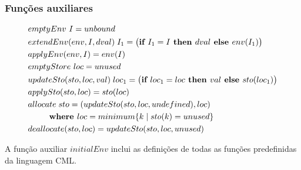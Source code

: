 \documentclass[12pt]{article}
\begin{document}
\subsubsection{Funções auxiliares}

\begin{align*}
&emptyEnv\ I = unbound \\
&extendEnv(env, I, dval) \;I_1 = \big(\textbf{if } I_1 = I \textbf{ then } dval \textbf{ else } env(I_1)\big) \\
&applyEnv(env, I) = env(I) \\
&emptyStore\ loc = unused \\
&updateSto(sto,loc,val) \;loc_1 = \big( \textbf{if $loc_1 = loc$ then $val$ else $sto(loc_1)$}\big) \\
&applySto(sto, loc) = sto(loc)\\
&allocate \;sto = (updateSto(sto, loc, undefined), loc) \\
&\hspace{6ex} \textbf{where } loc = minimum \{k \mid sto(k) = unused\} \\
&deallocate(sto,loc) = updateSto(sto,loc,unused)
\end{align*} 

A função auxiliar $initialEnv$ inclui as definições de todas as funções predefinidas da linguagem CML.
\end{document}
